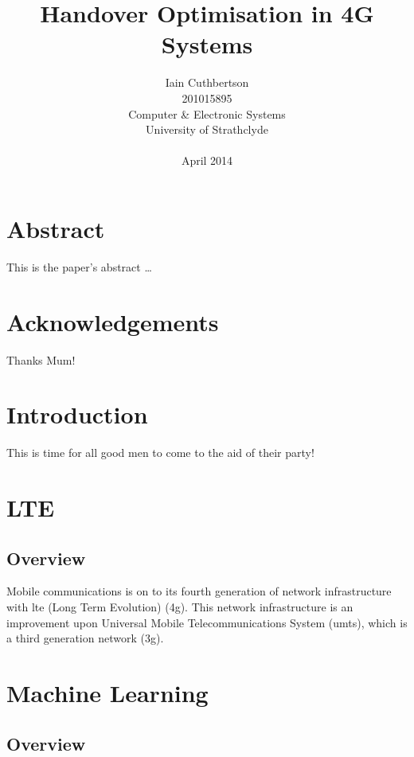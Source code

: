 \documentclass[12pt, oneside]{report}
\title{Handover Optimisation in 4G Systems}
\author{
        Iain Cuthbertson \\
        201015895\\
        Computer \& Electronic Systems\\
        University of Strathclyde\\
        \\
        April 2014\\
}
\date{}
\begin{document}
\maketitle


\chapter*{Abstract}
This is the paper's abstract \ldots
{}
\pagebreak

\chapter*{Acknowledgements}
 Thanks Mum!
\pagebreak

\tableofcontents
\pagebreak


\printacronyms[include-classes=nomencl,name=Nomenclature]
\pagebreak

\listoffigures
{}
\pagebreak

\chapter{Introduction}
This is time for all good men to come to the aid of their party!

\chapter{LTE}\label{lte}
\section{Overview}
Mobile communications is on to its fourth generation of network infrastructure with \ac{lte} (Long Term Evolution) (\ac{4g}). This network infrastructure is an improvement upon Universal Mobile Telecommunications System (\ac{umts}), which is a third generation network (\ac{3g}).

\chapter{Machine Learning}\label{machine learning}
\section{Overview}
\end{document}
